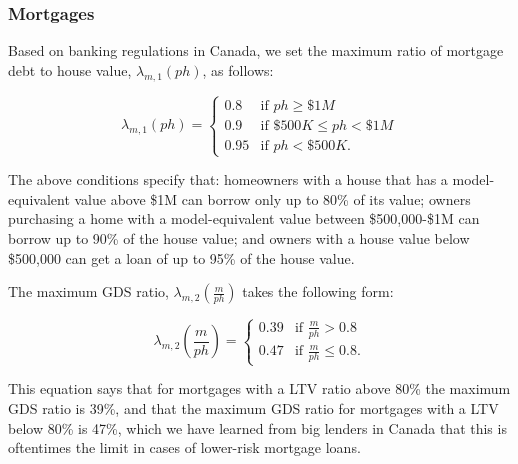 \documentclass[parskip=full]{article}
\begin{document}
\subsubsection{Mortgages}

Based on banking regulations in Canada, we set the maximum ratio of mortgage debt to house value, $\lambda_{m,1}(ph)$, as follows:

\begin{equation*}
\lambda_{m,1}(ph) = \begin{cases}
0.8 &\text{if $ph\geq \$1M$}\\
0.9 &\text{if $\$500K\leq ph< \$1M$}\\
0.95 &\text{if $ph < \$500K$}.
\end{cases}
\end{equation*}

\noindent The above conditions specify that: homeowners with a house that has a model-equivalent value above \$1M can borrow only up to 80\% of its value; owners purchasing a home with a model-equivalent value between \$500,000-\$1M can borrow up to 90\% of the house value; and owners with a house value below \$500,000 can get a loan of up to 95\% of the house value. 

The maximum GDS ratio, $\lambda_{m,2}\left(\frac{m}{ph}\right)$ takes the following form:

\begin{equation*}
\lambda_{m,2}\left(\frac{m}{ph}\right) = \begin{cases}
0.39 &\text{if $\frac{m}{ph}>0.8$}\\
0.47 &\text{if $\frac{m}{ph}\leq 0.8$}.
\end{cases}
\end{equation*}

\noindent This equation says that for mortgages with a LTV ratio above 80\% the maximum GDS ratio is 39\%, and that the maximum GDS ratio for mortgages with a LTV below 80\% is 47\%, which we have learned from big lenders in Canada that this is oftentimes the limit in cases of lower-risk mortgage loans. 
\end{document}
